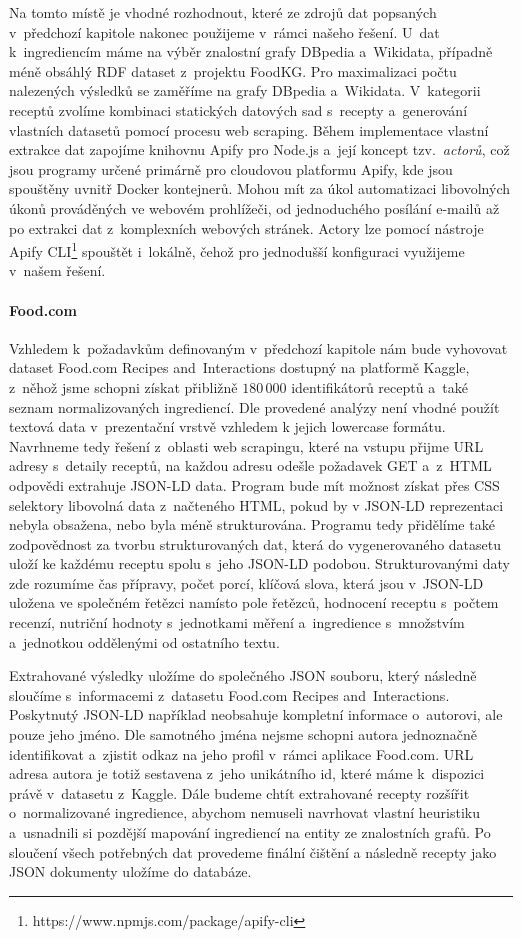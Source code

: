 Na tomto místě je vhodné rozhodnout, které ze zdrojů dat popsaných v~předchozí kapitole nakonec použijeme v~rámci našeho řešení. U~dat k~ingrediencím máme na výběr znalostní grafy DBpedia a~Wikidata, případně méně obsáhlý RDF dataset z~projektu FoodKG. Pro maximalizaci počtu nalezených výsledků se zaměříme na grafy DBpedia a~Wikidata. V~kategorii receptů zvolíme kombinaci statických datových sad s~recepty a~generování vlastních datasetů pomocí procesu web scraping. Během implementace vlastní extrakce dat zapojíme knihovnu Apify pro Node.js a~její koncept tzv.~\emph{actorů}, což jsou programy určené primárně pro cloudovou platformu Apify, kde jsou spouštěny uvnitř Docker kontejnerů. Mohou mít za úkol automatizaci libovolných úkonů prováděných ve webovém prohlížeči, od jednoduchého posílání e-mailů až po extrakci dat z~komplexních webových stránek. Actory lze pomocí nástroje Apify CLI\footnote{https://www.npmjs.com/package/apify-cli} spouštět i~lokálně, čehož pro jednodušší konfiguraci využijeme v~našem řešení.

\paragraph{Food.com}

Vzhledem k~požadavkům definovaným v~předchozí kapitole nám bude vyhovovat dataset Food.com Recipes and~Interactions dostupný na platformě Kaggle, z~něhož jsme schopni získat přibližně $180\,000$ identifikátorů receptů a~také seznam normalizovaných ingrediencí. Dle provedené analýzy není vhodné použít textová data v~prezentační vrstvě vzhledem k jejich lowercase formátu. Navrhneme tedy řešení z~oblasti web scrapingu, které na vstupu přijme URL adresy s~detaily receptů, na každou adresu odešle požadavek GET a~z~HTML odpovědi extrahuje JSON-LD data. Program bude mít možnost získat přes CSS selektory libovolná data z~načteného HTML, pokud by v JSON-LD reprezentaci nebyla obsažena, nebo byla méně strukturována. Programu tedy přidělíme také zodpovědnost za tvorbu strukturovaných dat, která do vygenerovaného datasetu uloží ke každému receptu spolu s~jeho JSON-LD podobou. Strukturovanými daty zde rozumíme čas přípravy, počet porcí, klíčová slova, která jsou v~JSON-LD uložena ve společném řetězci namísto pole řetězců, hodnocení receptu s~počtem recenzí, nutriční hodnoty s~jednotkami měření a~ingredience s~množstvím a~jednotkou oddělenými od ostatního textu.

Extrahované výsledky uložíme do společného JSON souboru, který následně sloučíme s~informacemi z~datasetu Food.com Recipes and~Interactions. Poskytnutý JSON-LD například neobsahuje kompletní informace o~autorovi, ale pouze jeho jméno. Dle samotného jména nejsme schopni autora jednoznačně identifikovat a~zjistit odkaz na jeho profil v~rámci aplikace Food.com. URL adresa autora je totiž sestavena z~jeho unikátního id, které máme k~dispozici právě v~datasetu z~Kaggle. Dále budeme chtít extrahované recepty rozšířit o~normalizované ingredience, abychom nemuseli navrhovat vlastní heuristiku a~usnadnili si pozdější mapování ingrediencí na entity ze znalostních grafů. Po sloučení všech potřebných dat provedeme finální čištění a následně recepty jako JSON dokumenty uložíme do databáze.

